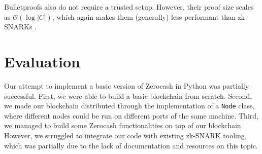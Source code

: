 \documentclass{article}
\begin{document}
Bulletproofs also do not require a trusted setup. However, their proof size scales as $\mathcal{O}(\log{|C|})$, which again makes them (generally) less performant than zk-SNARKs \cite{zk-snarks-blockchains-chapter}.

\section{Evaluation}
Our attempt to implement a basic version of Zerocash in Python was partially successful. First, we were able to build a basic blockchain from scratch. Second, we made our blockchain distributed through the implementation of a \texttt{Node} class, where different nodes could be run on different ports of the same machine. Third, we managed to build some Zerocash functionalities on top of our blockchain. However, we struggled to integrate our code with existing zk-SNARK tooling, which was partially due to the lack of documentation and resources on this topic.

\printbibliography
\end{document}
